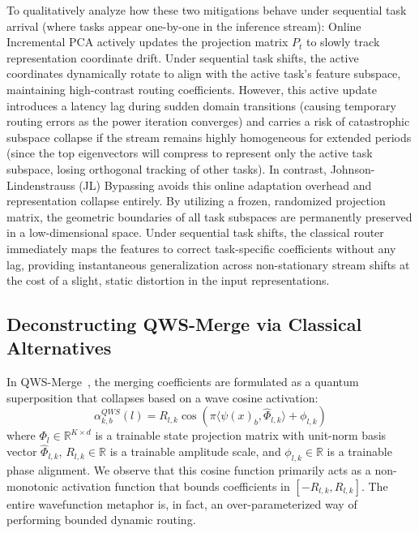 To qualitatively analyze how these two mitigations behave under sequential task arrival (where tasks appear one-by-one in the inference stream): Online Incremental PCA actively updates the projection matrix $P_t$ to slowly track representation coordinate drift. Under sequential task shifts, the active coordinates dynamically rotate to align with the active task's feature subspace, maintaining high-contrast routing coefficients. However, this active update introduces a latency lag during sudden domain transitions (causing temporary routing errors as the power iteration converges) and carries a risk of catastrophic subspace collapse if the stream remains highly homogeneous for extended periods (since the top eigenvectors will compress to represent only the active task subspace, losing orthogonal tracking of other tasks). In contrast, Johnson-Lindenstrauss (JL) Bypassing avoids this online adaptation overhead and representation collapse entirely. By utilizing a frozen, randomized projection matrix, the geometric boundaries of all task subspaces are permanently preserved in a low-dimensional space. Under sequential task shifts, the classical router immediately maps the features to correct task-specific coefficients without any lag, providing instantaneous generalization across non-stationary stream shifts at the cost of a slight, static distortion in the input representations.

\subsection{Deconstructing QWS-Merge via Classical Alternatives}
In QWS-Merge~\cite{qwsmerge}, the merging coefficients are formulated as a quantum superposition that collapses based on a wave cosine activation:
\begin{equation}
    \alpha_{k, b}^{QWS}(l) = R_{l, k} \cos\left( \pi \langle \psi(x)_b, \hat{\Phi}_{l, k} \rangle + \phi_{l, k} \right)
\end{equation}
where $\Phi_l \in \mathbb{R}^{K \times d}$ is a trainable state projection matrix with unit-norm basis vector $\hat{\Phi}_{l, k}$, $R_{l, k} \in \mathbb{R}$ is a trainable amplitude scale, and $\phi_{l, k} \in \mathbb{R}$ is a trainable phase alignment. We observe that this cosine function primarily acts as a non-monotonic activation function that bounds coefficients in $[-R_{l, k}, R_{l, k}]$. The entire wavefunction metaphor is, in fact, an over-parameterized way of performing bounded dynamic routing.

